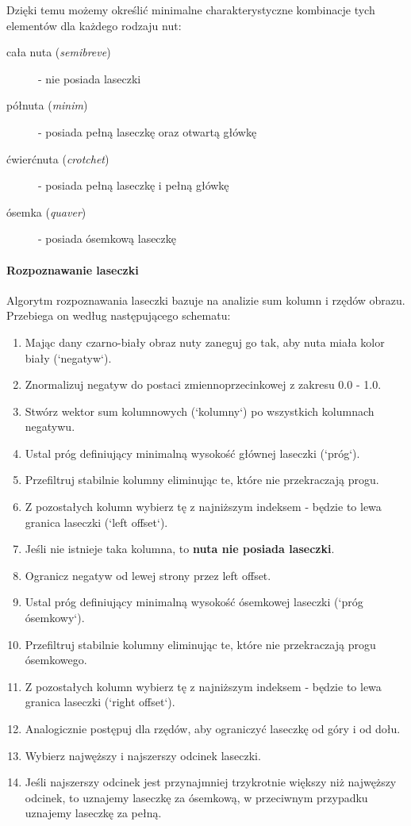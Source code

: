 \documentclass[12pt, letterpaper]{article}
\begin{document}
Dzięki temu możemy określić minimalne charakterystyczne kombinacje tych elementów dla każdego rodzaju nut:

\begin{description}
    \item [cała nuta (\textit{semibreve})] - nie posiada laseczki
    \item [półnuta (\textit{minim})] - posiada pełną laseczkę oraz otwartą główkę
    \item [ćwierćnuta (\textit{crotchet})] - posiada pełną laseczkę i pełną główkę
    \item [ósemka (\textit{quaver})] - posiada ósemkową laseczkę
\end{description}

\paragraph*{Rozpoznawanie laseczki}
Algorytm rozpoznawania laseczki bazuje na analizie sum kolumn i rzędów obrazu.
Przebiega on według następującego schematu:
\begin{enumerate}
    \item Mając dany czarno-biały obraz nuty zaneguj go tak, aby nuta miała kolor biały (`negatyw`).
    \item Znormalizuj negatyw do postaci zmiennoprzecinkowej z zakresu 0.0 - 1.0.
    \item Stwórz wektor sum kolumnowych (`kolumny`) po wszystkich kolumnach negatywu.
    \item Ustal próg definiujący minimalną wysokość głównej laseczki (`próg`).
    \item Przefiltruj stabilnie kolumny eliminując te, które nie przekraczają progu.
    \item Z pozostałych kolumn wybierz tę z najniższym indeksem - będzie to lewa granica laseczki (`left offset`).
    \item Jeśli nie istnieje taka kolumna, to \textbf{nuta nie posiada laseczki}.
    \item Ogranicz negatyw od lewej strony przez left offset.
    \item Ustal próg definiujący minimalną wysokość ósemkowej laseczki (`próg ósemkowy`).
    \item Przefiltruj stabilnie kolumny eliminując te, które nie przekraczają progu ósemkowego.
    \item Z pozostałych kolumn wybierz tę z najniższym indeksem - będzie to lewa granica laseczki (`right offset`).
    \item Analogicznie postępuj dla rzędów, aby ograniczyć laseczkę od góry i od dołu.
    \item Wybierz najwęższy  i najszerszy odcinek laseczki.
    \item Jeśli najszerszy odcinek jest przynajmniej trzykrotnie większy niż najwęższy odcinek, to uznajemy laseczkę za ósemkową, w przeciwnym przypadku uznajemy laseczkę za pełną.
\end{enumerate}
\end{document}
